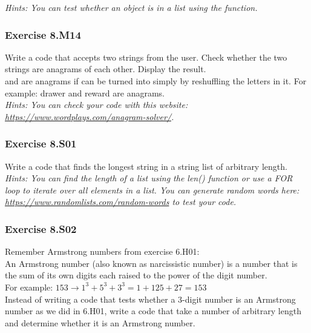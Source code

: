 \textit{Hints:
You can test whether an object is in a list using the {} function.}\\[1cm]



\subsubsection*{Exercise 8.M14}
Write a code that accepts two strings from the user. Check whether the two strings are
anagrams of each other. Display the result.\\
{} and {} are anagrams if {} can be turned into {} simply by reshuffling the letters in it. For example: drawer and reward are anagrams.\\


\textit{Hints:
You can check your code with this website: \url{https://www.wordplays.com/anagram-solver/}.}\\[1cm]



\subsubsection*{Exercise 8.S01}
Write a code that finds the longest string in a string list of arbitrary length.\\


\textit{Hints:
You can find the length of a list using the len() function or use a FOR loop to iterate over all elements in a list. You can generate random words here: \url{https://www.randomlists.com/random-words} to test your code.}\\[1cm]



\subsubsection*{Exercise 8.S02}
Remember Armstrong numbers from exercise 6.H01:\\
An Armstrong number (also known as narcissistic number) is a number that is the sum of its
own digits each raised to the power of the digit number.\\
For example: $153 \rightarrow 1^3 + 5^3 + 3^3 = 1 + 125 + 27 = 153$\\
Instead of writing a code that tests whether a 3-digit number is an Armstrong number as we
did in 6.H01, write a code that take a number of arbitrary length and determine whether it is
an Armstrong number.\\


